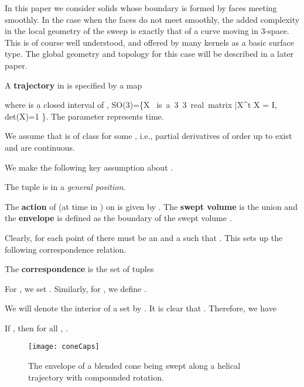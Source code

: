 \documentclass{elsart5p}
\begin{document}
In this paper we consider solids whose boundary is formed by faces meeting smoothly.  In the case 
when the faces do not meet smoothly,  the added complexity in the 
local geometry of the sweep is exactly that of a curve moving in 3-space.
This is of course well understood, and offered by many kernels as a basic 
surface type.  The global geometry and topology for this case will be described in a later paper.

\begin{defn} \label{trajectoryDef}
A {\bf trajectory} in  is specified by a map 

where  is a closed interval of , SO(3)=\{X \mbox{ is a 3 3 real matrix} |X^t \cdot X = I, det(X)=1  \}.    The parameter  represents time.    
\end{defn}

We assume that  is of class  for some , i.e., partial derivatives of order up to  exist and are continuous.  

We make the following key assumption about .

\begin{assum} \label{genericAssum}
The tuple  is in a {\em general position}.
\end{assum}


\begin{defn}  \label{envlDef}
The {\bf action} of  (at time  in ) on  is given 
by .  
The {\bf swept volume}  is the union 
 and the {\bf envelope}  is defined as the 
boundary of the swept volume .  
\end{defn}

Clearly, for each point  of  there must be an  and a  
such that .  This sets up the following correspondence relation.


\begin{defn} \label{corrDef}
The {\bf correspondence}  is the set of tuples  
 
For , we set . 
Similarly, for , we define .
\end{defn}

We will denote the interior of a set  by .
It is clear that . Therefore, we have

\begin{lem} \label{intLem}
If , then for all ,  .
\end{lem}

\begin{figure}
 \centering
 \texttt{[image: coneCaps]}
 \caption{The envelope of a blended cone being swept along a helical trajectory with compounded rotation.}
 \label{coneFig}
\end{figure}
\end{document}
